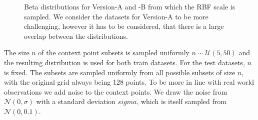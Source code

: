 \begin{figure}
	\centering
	\resizebox{0.4\textwidth}{!}{
		
	}
	\caption{Beta distributions for Version-A and -B from which the RBF scale is sampled. We consider the datasets for Version-A to be more challenging, however it has to be considered, that there is a large overlap between the distributions.}
	\label{fig:beta_scales}
\end{figure}

The size $n$ of the context point subsets is sampled uniformly $n\sim \mathcal{U}(5,50)$ and the resulting distribution is used for both train datasets.  For the test datasets, $n$ is fixed. The subsets are sampled uniformly from all possible subsets of size $n$, with the original grid always being 128 points. To be more in line with real world observations we add noise to the context points. We draw the noise from $\mathcal{N}(0,\sigma)$ with a standard deviation $sigma$, which is itself sampled from $\mathcal{N}(0,0.1)$.